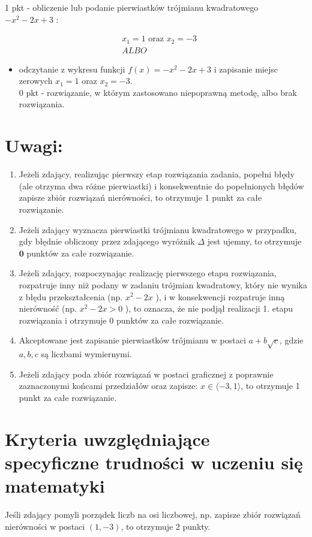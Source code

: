\documentclass[10pt]{article}
\begin{document}
1 pkt - obliczenie lub podanie pierwiastków trójmianu kwadratowego $-x^{2}-2 x+3$ :

$$
\begin{aligned}
& x_{1}=1 \text { oraz } x_{2}=-3 \\
& A L B O
\end{aligned}
$$

\begin{itemize}
  \item odczytanie z wykresu funkcji $f(x)=-x^{2}-2 x+3$ i zapisanie miejsc zerowych $x_{1}=1$ oraz $x_{2}=-3$.\\
0 pkt - rozwiązanie, w którym zastosowano niepoprawną metodę, albo brak rozwiązania.
\end{itemize}

\section*{Uwagi:}
\begin{enumerate}
  \item Jeżeli zdający, realizując pierwszy etap rozwiązania zadania, popełni błędy (ale otrzyma dwa różne pierwiastki) i konsekwentnie do popełnionych błędów zapisze zbiór rozwiązań nierówności, to otrzymuje 1 punkt za całe rozwiązanie.
  \item Jeżeli zdający wyznacza pierwiastki trójmianu kwadratowego w przypadku, gdy błędnie obliczony przez zdającego wyróżnik $\Delta$ jest ujemny, to otrzymuje $\mathbf{0}$ punktów za całe rozwiązanie.
  \item Jeżeli zdający, rozpoczynając realizację pierwszego etapu rozwiązania, rozpatruje inny niż podany w zadaniu trójmian kwadratowy, który nie wynika z błędu przekształcenia (np. $x^{2}-2 x$ ), i w konsekwencji rozpatruje inną nierówność (np. $x^{2}-2 x>0$ ), to oznacza, że nie podjął realizacji 1. etapu rozwiązania i otrzymuje 0 punktów za całe rozwiązanie.
  \item Akceptowane jest zapisanie pierwiastków trójmianu w postaci $a+b \sqrt{c}$, gdzie $a, b, c$ są liczbami wymiernymi.
  \item Jeżeli zdający poda zbiór rozwiązań w postaci graficznej z poprawnie zaznaczonymi końcami przedziałów oraz zapisze: $x \in\langle-3,1\rangle$, to otrzymuje 1 punkt za całe rozwiązanie.
\end{enumerate}

\section*{Kryteria uwzględniające specyficzne trudności w uczeniu się matematyki}
Jeśli zdający pomyli porządek liczb na osi liczbowej, np. zapisze zbiór rozwiązań nierówności w postaci $(1,-3)$, to otrzymuje 2 punkty.
\end{document}
